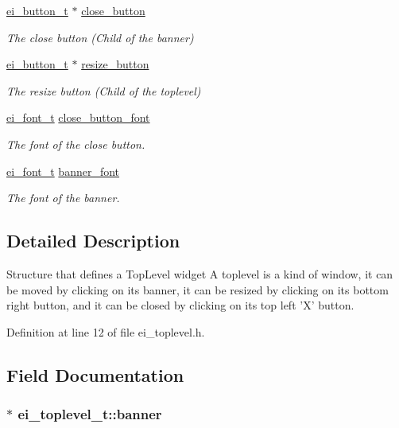 \begin{DoxyCompactItemize}
\hyperlink{structei__button__t}{ei\+\_\+button\+\_\+t} $\ast$ \hyperlink{structei__toplevel__t_a4efd970ca149d9e9f8e5d8dcabd5441b}{close\+\_\+button}
\begin{DoxyCompactList}\small\item\em The close button (Child of the banner) \end{DoxyCompactList}\item 
\hyperlink{structei__button__t}{ei\+\_\+button\+\_\+t} $\ast$ \hyperlink{structei__toplevel__t_a417d86f20456e1e21b57f9665b5409c8}{resize\+\_\+button}
\begin{DoxyCompactList}\small\item\em The resize button (Child of the toplevel) \end{DoxyCompactList}\item 
\hyperlink{ei__types_8h_a22c8198e4d641e4bc67bb17f9c6bcda7}{ei\+\_\+font\+\_\+t} \hyperlink{structei__toplevel__t_aec35a67c16125a0aa3adf345f1c597a9}{close\+\_\+button\+\_\+font}
\begin{DoxyCompactList}\small\item\em The font of the close button. \end{DoxyCompactList}\item 
\hyperlink{ei__types_8h_a22c8198e4d641e4bc67bb17f9c6bcda7}{ei\+\_\+font\+\_\+t} \hyperlink{structei__toplevel__t_a7d5368e56c6d56ae26536bce28499b32}{banner\+\_\+font}
\begin{DoxyCompactList}\small\item\em The font of the banner. \end{DoxyCompactList}\end{DoxyCompactItemize}


\subsection{Detailed Description}
Structure that defines a Top\+Level widget A toplevel is a kind of window, it can be moved by clicking on its banner, it can be resized by clicking on its bottom right button, and it can be closed by clicking on its top left 'X' button. 

Definition at line 12 of file ei\+\_\+toplevel.\+h.



\subsection{Field Documentation}
\hypertarget{structei__toplevel__t_a0adebbd97cffba4f38d5f7da127ba8fd}{
\subsubsection[{banner}]{$\ast$ ei\+\_\+toplevel\+\_\+t\+::banner}}\label{structei__toplevel__t_a0adebbd97cffba4f38d5f7da127ba8fd}


